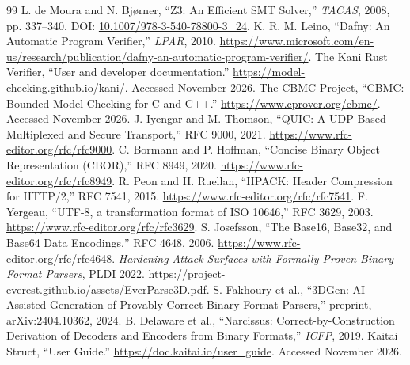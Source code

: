 \documentclass[10pt,twocolumn]{article}
\begin{document}
\begin{thebibliography}{99}
 L. de Moura and N. Bj\o rner, ``Z3: An Efficient SMT Solver,'' \emph{TACAS}, 2008, pp. 337--340. DOI: \href{https://doi.org/10.1007/978-3-540-78800-3_24}{10.1007/978-3-540-78800-3\_24}.
 K. R. M. Leino, ``Dafny: An Automatic Program Verifier,'' \emph{LPAR}, 2010. \url{https://www.microsoft.com/en-us/research/publication/dafny-an-automatic-program-verifier/}.
 The Kani Rust Verifier, ``User and developer documentation.'' \url{https://model-checking.github.io/kani/}. Accessed November 2026.
 The CBMC Project, ``CBMC: Bounded Model Checking for C and C++.'' \url{https://www.cprover.org/cbmc/}. Accessed November 2026.
 J. Iyengar and M. Thomson, ``QUIC: A UDP-Based Multiplexed and Secure Transport,'' RFC 9000, 2021. \url{https://www.rfc-editor.org/rfc/rfc9000}.
 C. Bormann and P. Hoffman, ``Concise Binary Object Representation (CBOR),'' RFC 8949, 2020. \url{https://www.rfc-editor.org/rfc/rfc8949}.
 R. Peon and H. Ruellan, ``HPACK: Header Compression for HTTP/2,'' RFC 7541, 2015. \url{https://www.rfc-editor.org/rfc/rfc7541}.
 F. Yergeau, ``UTF-8, a transformation format of ISO 10646,'' RFC 3629, 2003. \url{https://www.rfc-editor.org/rfc/rfc3629}.
 S. Josefsson, ``The Base16, Base32, and Base64 Data Encodings,'' RFC 4648, 2006. \url{https://www.rfc-editor.org/rfc/rfc4648}.
 \emph{Hardening Attack Surfaces with Formally Proven Binary Format Parsers}, PLDI 2022. \url{https://project-everest.github.io/assets/EverParse3D.pdf}.
 S. Fakhoury et al., ``3DGen: AI-Assisted Generation of Provably Correct Binary Format Parsers,'' preprint, arXiv:2404.10362, 2024.
 B. Delaware et al., ``Narcissus: Correct-by-Construction Derivation of Decoders and Encoders from Binary Formats,'' \emph{ICFP}, 2019.
 Kaitai Struct, ``User Guide.'' \url{https://doc.kaitai.io/user_guide}. Accessed November 2026.
\end{thebibliography}
\end{document}
